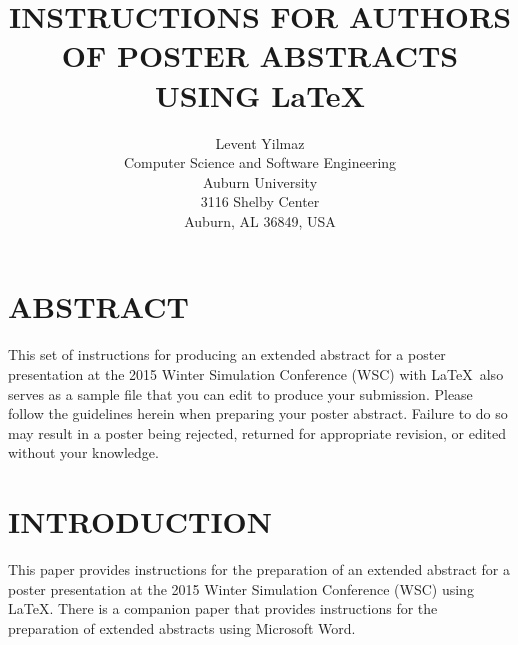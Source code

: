 \documentclass{wscposterproc}
\begin{document}
%
%
%

\title{INSTRUCTIONS FOR AUTHORS OF POSTER ABSTRACTS USING \LaTeX}

\author{Levent Yilmaz \\[12pt]
Computer Science and Software Engineering\\
Auburn University \\
3116 Shelby Center\\
Auburn, AL 36849, USA
}

\maketitle


\section*{ABSTRACT}

This set of instructions for producing an extended abstract for a poster presentation at the 2015 Winter Simulation Conference (WSC) with \LaTeX\ also serves as a sample file that you can edit to produce your submission. Please follow the guidelines herein when preparing your poster abstract. Failure to do so may result in a poster being rejected, returned for appropriate revision, or edited without your knowledge.

\section{INTRODUCTION}
This paper provides instructions for the preparation of an extended abstract for a poster presentation at the 2015 Winter Simulation Conference (WSC) using \LaTeX. There is a companion paper that provides instructions for the preparation of extended abstracts using Microsoft Word.
\end{document}
